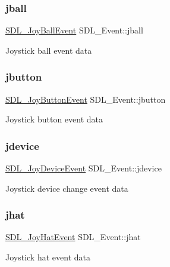 \subsubsection{\texorpdfstring{jball}{jball}}
{\footnotesize\ttfamily \hyperlink{structSDL__JoyBallEvent}{S\+D\+L\+\_\+\+Joy\+Ball\+Event} S\+D\+L\+\_\+\+Event\+::jball}

Joystick ball event data \mbox{\label{unionSDL__Event_a591104d64903ae1cf70874fb5d3124ff}} 
\subsubsection{\texorpdfstring{jbutton}{jbutton}}
{\footnotesize\ttfamily \hyperlink{structSDL__JoyButtonEvent}{S\+D\+L\+\_\+\+Joy\+Button\+Event} S\+D\+L\+\_\+\+Event\+::jbutton}

Joystick button event data \mbox{\label{unionSDL__Event_a17514dc19a846ea1b5fbe44123700c4c}} 
\subsubsection{\texorpdfstring{jdevice}{jdevice}}
{\footnotesize\ttfamily \hyperlink{structSDL__JoyDeviceEvent}{S\+D\+L\+\_\+\+Joy\+Device\+Event} S\+D\+L\+\_\+\+Event\+::jdevice}

Joystick device change event data \mbox{\label{unionSDL__Event_a421b40e0f8e01f181c8d5548cff1dd1d}} 
\subsubsection{\texorpdfstring{jhat}{jhat}}
{\footnotesize\ttfamily \hyperlink{structSDL__JoyHatEvent}{S\+D\+L\+\_\+\+Joy\+Hat\+Event} S\+D\+L\+\_\+\+Event\+::jhat}

Joystick hat event data \mbox{\label{unionSDL__Event_ab99927835cc77a9b6bb50b419b4a27df}} 

